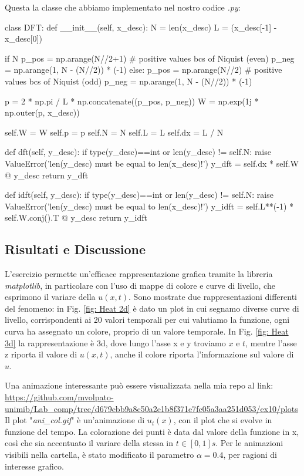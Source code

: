 \medskip
\noindent Questa la classe che abbiamo implementato nel nostro codice \textit{.py}:
\begin{elegantcode}
class DFT:
    def __init__(self, x_desc):
        N = len(x_desc)
        L = (x_desc[-1] - x_desc[0])
        
        if N %
            p_pos = np.arange(N//2+1)   # positive values bcs of Niquist (even)
            p_neg = np.arange(1, N - (N//2)) * (-1)
        else: 
            p_pos = np.arange(N//2)     # positive values bcs of Niquist (odd)
            p_neg = np.arange(1, N - (N//2)) * (-1)

        p = 2 * np.pi / L * np.concatenate((p_pos, p_neg))
        W = np.exp(1j * np.outer(p, x_desc))

        self.W = W
        self.p = p
        self.N = N
        self.L = L
        self.dx = L / N
    
    def dft(self, y_desc):
        if type(y_desc)==int or len(y_desc) != self.N:
            raise ValueError('len(y_desc) must be equal to len(x_desc)!')
        y_dft = self.dx * self.W @ y_desc
        return y_dft

    def idft(self, y_desc):
        if type(y_desc)==int or len(y_desc) != self.N:
            raise ValueError('len(y_desc) must be equal to len(x_desc)!')
        y_idft = self.L**(-1) * self.W.conj().T @ y_desc
        return y_idft
    
\end{elegantcode}

\subsection{Risultati e Discussione}
L'esercizio permette un'efficace rappresentazione grafica tramite la libreria \textit{matplotlib}, in particolare con l'uso di mappe di colore e curve di livello, che esprimono il variare della $u(x,t)$. Sono mostrate due rappresentazioni differenti del fenomeno: in Fig. \ref{fig: Heat 2d} è dato un plot in cui segnamo diverse curve di livello, corrispondenti ai 20 valori temporali per cui valutiamo la funzione, ogni curva ha assegnato un colore, proprio di un valore temporale. In Fig. \ref{fig: Heat 3d} la rappresentazione è 3d, dove lungo l'asse x e y troviamo $x$ e $t$, mentre l'asse z riporta il valore di $u(x,t)$, anche il colore riporta l'informazione sul valore di $u$.

\bigskip
\noindent Una animazione interessante può essere visualizzata nella mia repo al link: \\
\url{https://github.com/mvolpato-unimib/Lab_comp/tree/d679cbb9a8c50a2e1b8f371e7fc05a3aa251d053/ex10/plots}\\
Il plot "\textit{ani\_col.gif}" è un'animazione di $u_t(x)$, con il plot che si evolve in funzione del tempo. La colorazione dei punti è data dal valore della funzione in x, così che sia accentuato il variare della stessa in $t \in [0, 1]s$. Per le animazioni visibili nella cartella, è stato modificato il parametro $\alpha=0.4$, per ragioni di interesse grafico.


